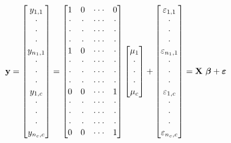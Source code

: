 \begin{equation}\label{E4:MatrixOneFactor}
\mathbf{y}=%
\begin{bmatrix}
y_{1,1} \\
\cdot  \\
\cdot  \\
\cdot  \\
y_{n_1,1} \\
\cdot  \\
\cdot  \\
\cdot  \\
y_{1,c} \\
\cdot  \\
\cdot  \\
\cdot  \\
y_{n_{c},c}%
\end{bmatrix}%
=%
\begin{bmatrix}
1 & 0 & \cdot \cdot \cdot  & 0 \\
\cdot  & \cdot  & \cdot \cdot \cdot  & \cdot  \\
\cdot  & \cdot  & \cdot \cdot \cdot  & \cdot  \\
\cdot  & \cdot  & \cdot \cdot \cdot  & \cdot  \\
1 & 0 & \cdot \cdot \cdot  & \cdot  \\
\cdot  & \cdot  & \cdot \cdot \cdot  & \cdot  \\
\cdot  & \cdot  & \cdot \cdot \cdot  & \cdot  \\
\cdot  & \cdot  & \cdot \cdot \cdot  & \cdot  \\
0 & 0 & \cdot \cdot \cdot  & 1 \\
\cdot  & \cdot  & \cdot \cdot \cdot  & \cdot  \\
\cdot  & \cdot  & \cdot \cdot \cdot  & \cdot  \\
\cdot  & \cdot  & \cdot \cdot \cdot  & \cdot  \\
0 & 0 & \cdot \cdot \cdot  & 1%
\end{bmatrix}%
\begin{bmatrix}
\mu_1 \\
\cdot  \\
\cdot  \\
\cdot  \\
\mu_c%
\end{bmatrix}%
+%
\begin{bmatrix}
\varepsilon_{1,1} \\
\cdot  \\
\cdot  \\
\cdot  \\
\varepsilon_{n_1,1} \\
\cdot  \\
\cdot  \\
\cdot  \\
\varepsilon_{1,c} \\
\cdot  \\
\cdot  \\
\cdot  \\
\varepsilon_{n_{c},c}%
\end{bmatrix}%
=\mathbf{X\ \boldsymbol \beta + \boldsymbol \varepsilon} \text{\ \ \
\ }
\end{equation}



